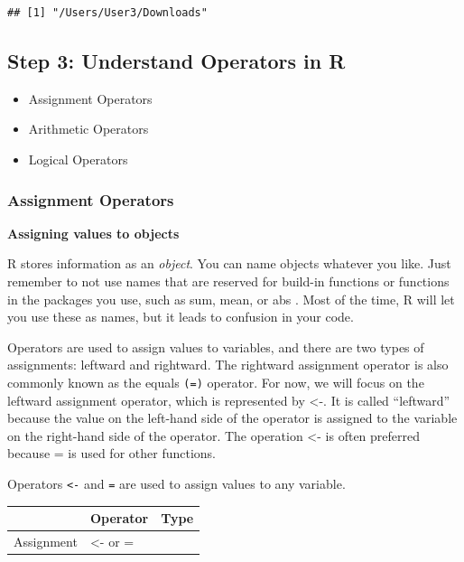 \documentclass[
]{article}
\providecommand{\tightlist}{%
  \setlength{\itemsep}{0pt}\setlength{\parskip}{0pt}}
\begin{document}
\begin{verbatim}
## [1] "/Users/User3/Downloads"
\end{verbatim}

\hypertarget{step-3-understand-operators-in-r}{%
\subsection{Step 3: Understand Operators in
R}\label{step-3-understand-operators-in-r}}

\begin{itemize}
\tightlist
\item
  Assignment Operators
\item
  Arithmetic Operators
\item
  Logical Operators
\end{itemize}

\hypertarget{assignment-operators}{%
\subsubsection{Assignment Operators}\label{assignment-operators}}

\textbf{Assigning values to objects}

R stores information as an \emph{object}. You can name objects whatever
you like. Just remember to not use names that are reserved for build-in
functions or functions in the packages you use, such as sum, mean, or
abs . Most of the time, R will let you use these as names, but it leads
to confusion in your code.

Operators are used to assign values to variables, and there are two
types of assignments: leftward and rightward. The rightward assignment
operator is also commonly known as the equals \texttt{(=)} operator. For
now, we will focus on the leftward assignment operator, which is
represented by \textless-. It is called ``leftward'' because the value
on the left-hand side of the operator is assigned to the variable on the
right-hand side of the operator. The operation \textless- is often
preferred because = is used for other functions.

Operators \texttt{\textless{}-} and \texttt{=} are used to assign values
to any variable.

\begin{longtable}[]{@{}lll@{}}
\toprule\noalign{}
& Operator & Type \\
\midrule\noalign{}
\endhead
\bottomrule\noalign{}
\endlastfoot
Assignment & \textless- or = & \\
\end{longtable}
\end{document}
